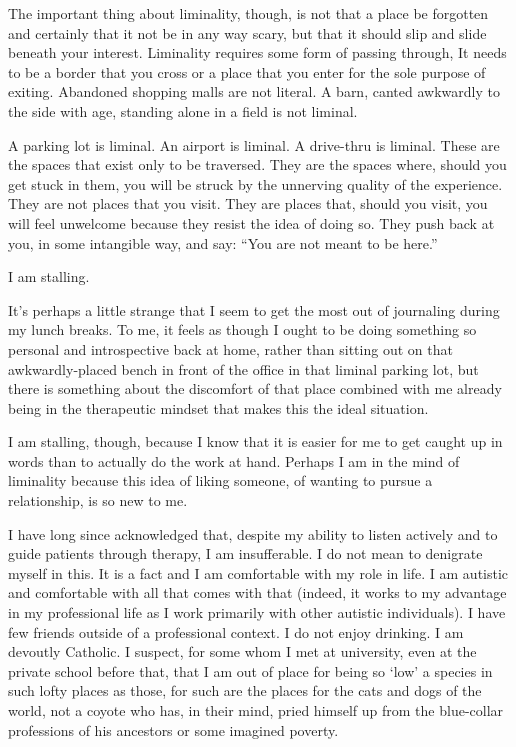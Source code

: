 The important thing about liminality, though, is not that a place be forgotten and certainly that it not be in any way scary, but that it should slip and slide beneath your interest. Liminality requires some form of passing through, It needs to be a border that you cross or a place that you enter for the sole purpose of exiting. Abandoned shopping malls are not literal. A barn, canted awkwardly to the side with age, standing alone in a field is not liminal.

A parking lot is liminal. An airport is liminal. A drive-thru is liminal. These are the spaces that exist only to be traversed. They are the spaces where, should you get stuck in them, you will be struck by the unnerving quality of the experience. They are not places that you visit. They are places that, should you visit, you will feel unwelcome because they resist the idea of doing so. They push back at you, in some intangible way, and say: ``You are not meant to be here.''

I am stalling.

It's perhaps a little strange that I seem to get the most out of journaling during my lunch breaks. To me, it feels as though I ought to be doing something so personal and introspective back at home, rather than sitting out on that awkwardly-placed bench in front of the office in that liminal parking lot, but there is something about the discomfort of that place combined with me already being in the therapeutic mindset that makes this the ideal situation.

I am stalling, though, because I know that it is easier for me to get caught up in words than to actually do the work at hand. Perhaps I am in the mind of liminality because this idea of liking someone, of wanting to pursue a relationship, is so new to me.

I have long since acknowledged that, despite my ability to listen actively and to guide patients through therapy, I am insufferable. I do not mean to denigrate myself in this. It is a fact and I am comfortable with my role in life. I am autistic and comfortable with all that comes with that (indeed, it works to my advantage in my professional life as I work primarily with other autistic individuals). I have few friends outside of a professional context. I do not enjoy drinking. I am devoutly Catholic. I suspect, for some whom I met at university, even at the private school before that, that I am out of place for being so `low' a species in such lofty places as those, for such are the places for the cats and dogs of the world, not a coyote who has, in their mind, pried himself up from the blue-collar professions of his ancestors or some imagined poverty.

